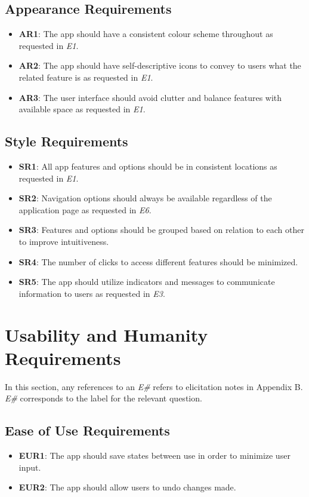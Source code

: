 \documentclass[12pt]{article}
\begin{document}
\subsection{Appearance Requirements}
\begin{itemize}
  \item \textbf{AR1}: The app should have a consistent colour scheme throughout as requested in \textit{E1}.
  \item \textbf{AR2}: The app should have self-descriptive icons to convey to users what the related feature is as requested in \textit{E1}.
  \item \textbf{AR3}: The user interface should avoid clutter and balance features with available space as requested in \textit{E1}.
\end{itemize}
\subsection{Style Requirements}
\begin{itemize}
  \item \textbf{SR1}: All app features and options should be in consistent locations as requested in \textit{E1}.
  \item \textbf{SR2}: Navigation options should always be available regardless of the application page as requested in \textit{E6}.
  \item \textbf{SR3}: Features and options should be grouped based on relation to each other to improve intuitiveness.
  \item \textbf{SR4}: The number of clicks to access different features should be minimized.
  \item \textbf{SR5}: The app should utilize indicators and messages to communicate information to users as requested in \textit{E3}.
\end{itemize}

\section{Usability and Humanity Requirements}
In this section, any references to an \textit{E\#} refers to elicitation notes in Appendix B. \textit{E\#} corresponds
to the label for the relevant question.

\subsection{Ease of Use Requirements}
\begin{itemize}
  \item \textbf{EUR1}: The app should save states between use in order to minimize user input.
  \item \textbf{EUR2}: The app should allow users to undo changes made.
\end{itemize}
\end{document}

